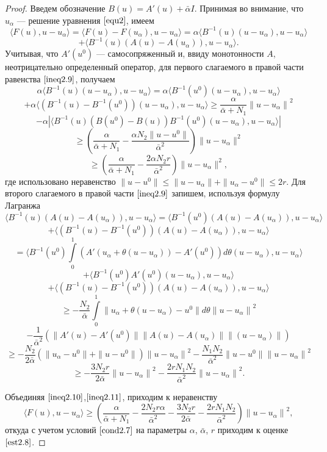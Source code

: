 \begin{proof} Введем обозначение $B(u)=A'(u)+\bar\alpha I$. Принимая во внимание, что $u_\alpha$ --- решение уравнения $\eqref{equ2}$, имеем
$$
\langle F(u), u-u_\alpha\rangle=\langle F(u)-F(u_\alpha), u-u_\alpha\rangle=\alpha\langle B^{-1}(u)(u-u_\alpha), u-u_\alpha\rangle$$ \begin{equation}\label{ineq2.9}+\langle B^{-1}(u)(A(u)-A(u_\alpha)), u-u_\alpha\rangle.
\end{equation}
Учитывая, что $A'(u^0)$ --- самосопряженный и, ввиду монотонности $A$, неотрицательно определенный оператор, для первого слагаемого в правой части равенства $\eqref{ineq2.9}$, получаем
$$\alpha\langle B^{-1}(u)(u-u_\alpha), u-u_\alpha\rangle=\alpha\langle B^{-1}(u^0)(u-u_\alpha), u-u_\alpha\rangle$$ $$+\alpha\langle (B^{-1}(u)-B^{-1}(u^0))(u-u_\alpha), u-u_\alpha\rangle \ge \frac{\alpha}{\bar\alpha+N_1}{\|u-u_\alpha\|}^2$$
$$ - \alpha|\langle B^{-1}(u)(B(u^0)-B(u))B^{-1}(u^0)(u-u_\alpha), u-u_\alpha\rangle| $$
$$\ge \left( \frac{\alpha}{\bar\alpha+N_1}-\frac{\alpha N_2\|u-u^0\|}{{\bar\alpha}^2}\right)\|u-u_\alpha\|^2$$
\begin{equation}\label{ineq2.10}
\ge\left(\frac{\alpha}{\bar\alpha+N_1}-\frac{2\alpha N_2r}{{\bar\alpha}^2}\right)\|u-u_\alpha\|^2,
\end{equation} где использовано неравенство $\|u-u^0\|\le\|u-u_\alpha\|+\|u_\alpha-u^0\|\le 2r$.
Для второго слагаемого в правой части $\eqref{ineq2.9}$ запишем, используя формулу Лагранжа \cite{Tre1993}
$$ \langle B^{-1}(u)(A(u)-A(u_\alpha)), u-u_\alpha\rangle= \langle B^{-1}(u^0)(A(u)-A(u_\alpha)), u-u_\alpha\rangle$$
$$+\langle (B^{-1}(u)-B^{-1}(u^0))(A(u)-A(u_\alpha)), u-u_\alpha\rangle$$
$$=\langle B^{-1}(u^0)\int\limits_0^1 (A'(u_\alpha+\theta(u-u_\alpha))-A'(u^0))d\theta (u-u_\alpha), u-u_\alpha\rangle$$
$$+ \langle B^{-1}(u^0)A'(u^0)(u-u_\alpha), u-u_\alpha\rangle $$
$$+\langle (B^{-1}(u)-B^{-1}(u^0))(A(u)-A(u_\alpha)), u-u_\alpha\rangle$$
$$\ge-\frac{N_2}{\bar\alpha}\int\limits_0^1\|u_\alpha+\theta(u-u_\alpha)-u^0\|d\theta {\|u-u_\alpha\|}^2 $$
$$-\frac{1}{{\bar\alpha}^2}\left ( \|A'(u)-A'(u^0)\|\|A(u)-A(u_\alpha)\|\|(u-u_\alpha)\|\right ) $$$$ \ge - \frac{N_2}{2\bar\alpha} \left ( \|u_\alpha-u^0\|+\|u-u^0\|\right ){\|u-u_\alpha\|}^2 - \frac{N_1 N_2}{{\bar\alpha}^2}\|u-u^0\| {\|u-u_\alpha\|}^2 $$
\begin{equation}\label{ineq2.11}
\ge -\frac{3N_2r}{2\bar\alpha}{\|u-u_\alpha\|}^2-\frac{2rN_1 N_2}{{\bar\alpha}^2}{\|u-u_\alpha\|}^2.\end{equation}

Объединяя $\eqref{ineq2.10}$,$\eqref{ineq2.11}$, приходим к неравенству $$
\langle F(u), u-u_\alpha\rangle\ge\left (\frac{\alpha}{\bar\alpha+N_1}-\frac{2N_2 r \alpha}{{\bar\alpha}^2}-\frac{3N_2r}{2\bar\alpha}-\frac{2rN_1 N_2}{{\bar\alpha}^2}\right ){\|u-u_\alpha\|}^2, $$ откуда с учетом условий $\eqref{cond2.7}$ на параметры $\alpha$, $\bar\alpha$, $r$ приходим к оценке $\eqref{est2.8}$.
\end{proof}
